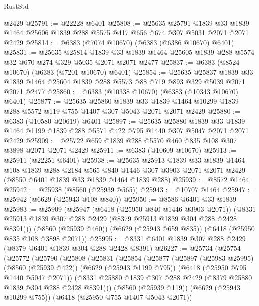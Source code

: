 \begin{lexlean}{RustStd}
\begin{coremodule}
    @2429
@25791 := @22228 @6401
@25808 := @25635
    @25791
    @1839
    @33
    @1839
    @1464
    @25606
    @1839
    @288
    @5575
    @417
    @656
    @674
    @307
    @5031
    @2071
    @2071
    @2429
@25814 := @6383 (@7074 @10670) (@6383 (@6386 @10670) @6401)
@25831 := @25635
    @25814
    @1839
    @33
    @1839
    @1464
    @25605
    @1839
    @288
    @5574
    @32
    @670
    @274
    @329
    @5035
    @2071
    @2071
    @2477
@25837 := @6383 (@8524 @10670) (@6383 (@7201 @10670) @6401)
@25854 := @25635
    @25837
    @1839
    @33
    @1839
    @1464
    @25604
    @1839
    @288
    @5573
    @88
    @719
    @893
    @329
    @5039
    @2071
    @2071
    @2477
@25860 := @6383 (@10338 @10670) (@6383 (@10343 @10670) @6401)
@25877 := @25635
    @25860
    @1839
    @33
    @1839
    @1464
    @10299
    @1839
    @288
    @5572
    @119
    @755
    @1407
    @307
    @5043
    @2071
    @2071
    @2429
@25880 := @6383 (@10580 @20619) @6401
@25897 := @25635
    @25880
    @1839
    @33
    @1839
    @1464
    @1199
    @1839
    @288
    @5571
    @422
    @795
    @1440
    @307
    @5047
    @2071
    @2071
    @2429
@25909 := @25722 @659 @1839 @288 @5570 @460 @835 @108 @307 @3898 @2071 @2071 @2429
@25911 := @6383 (@10609 @10670)
@25913 := @25911 (@22251 @6401)
@25938 := @25635
    @25913
    @1839
    @33
    @1839
    @1464
    @108
    @1839
    @288
    @2184
    @565
    @840
    @1446
    @307
    @3903
    @2071
    @2071
    @2429
    (@8550 @6401 @1839 @33 @1839 @1464 @1839 @288)
@25939 := @8572 @1464
@25942 := @25938 (@8560 (@25939 @565))
@25943 := @10707 @1464
@25947 := @25942 (@6629 (@25943 @108 @840))
@25950 := @8586 @6401 @33 @1839
@25983 := @25909
    (@25947
      (@6418 (@25950 @840 @1446 @3903 @2071))
      (@8331 @25913 @1839 @307 @288 @2429 (@8379 @25913 @1839 @304 @288 @2428 @8391)))
    (@8560 (@25939 @460))
    (@6629 (@25943 @659 @835))
    (@6418 (@25950 @835 @108 @3898 @2071))
@25995 := @8331 @6401 @1839 @307 @288 @2429 (@8379 @6401 @1839 @304 @288 @2428 @8391)
@26227 := @25734
    (@25754
      (@25772
        (@25790
          (@25808
            (@25831
              (@25854
                (@25877
                  (@25897
                    (@25983 @25995)
                    (@8560 (@25939 @422))
                    (@6629 (@25943 @1199 @795))
                    (@6418 (@25950 @795 @1440 @5047 @2071))
                    (@8331 @25880 @1839 @307 @288 @2429 (@8379 @25880 @1839 @304 @288 @2428 @8391)))
                  (@8560 (@25939 @119))
                  (@6629 (@25943 @10299 @755))
                  (@6418 (@25950 @755 @1407 @5043 @2071))

\end{coremodule}
\end{lexlean}
